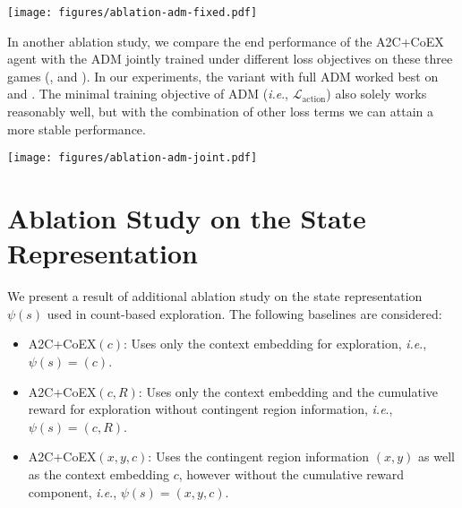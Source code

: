\documentclass{article} \usepackage{iclr,times}
\makeatletter
\newcommand{\coex}{{CoEX}}
\DeclareRobustCommand\onedot{\futurelet\@let@token\@onedot}
\def\onedot{.}
\def\ie{\emph{i.e}\onedot} \def\Ie{\emph{I.e}\onedot}
\makeatother
\begin{document}
{\begin{figure*}[th]
\begin{center}
    \texttt{[image: figures/ablation-adm-fixed.pdf]}
    \vspace*{-0.2cm}
    \caption{
        Performance of ADM in terms of mean distance
        under different loss combinations in early stages,
        trained using the same online trajectory data.
        Plots were obtained by averaging runs over 5 random seeds.
    }
    \label{fig:a2c_exp_ablation_adm_fixed}
\end{center}
\end{figure*}


In another ablation study, we compare the end performance of the A2C+\coex{} agent
with the ADM jointly trained under different loss objectives
on these three games (\MontezumaRevenge, \Freeway and \Seaquest).
In our experiments,
the variant with full ADM worked best on \MontezumaRevenge and \Freeway.
The minimal training objective of ADM (\ie, $\mathcal L_\text{action}$)
also solely works reasonably well, but with the combination of other loss terms
we can attain a more stable performance.

\begin{figure*}[th]
\begin{center}
    \texttt{[image: figures/ablation-adm-joint.pdf]}
    \vspace*{-0.2cm}
    \caption{
        Learning curves of A2C+CoEX with ADM trained under different training objectives.
        The curve in solid line shows the mean episode over 40 recent episodes,
        averaged over 3 random seeds.
}
    \label{fig:a2c_exp_ablation_adm_joint}
\end{center}
\end{figure*}





\clearpage

\section{Ablation Study on the State Representation}
\label{sec:ablation_representation}

We present a result of additional ablation study on the state representation $\psi(s)$ used in count-based exploration.
The following baselines are considered:

\begin{itemize}[leftmargin=7mm]
\setlength{\itemsep}{0pt}\setlength{\parskip}{3pt}
\item A2C+\coex$(c)$: Uses only the context embedding for exploration,
      \ie, $\psi(s) = (c)$.
\item A2C+\coex$(c,R)$: Uses only the context embedding and the cumulative reward for exploration
      without contingent region information, \ie, $\psi(s) = (c, R)$.
\item A2C+\coex$(x,y,c)$: Uses the contingent region information $(x, y)$ as well as the context embedding $c$,
      however without the cumulative reward component, \ie, $\psi(s) = (x, y, c)$.
\end{itemize}

}
\end{document}
